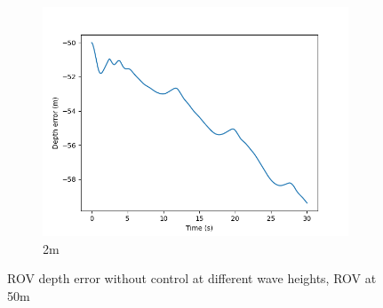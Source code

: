 \documentclass[class=article, crop=false]{standalone}
\begin{document}
\begin{figure}
\begin{subfigure}[b]{0.48\textwidth}
        \includegraphics{scenario1/rov-50m/2.0m/rov_depth_error_uncontrolled}
        \caption{2m}
        \label{}
    \end{subfigure}

    \caption{ROV depth error without control at different wave heights, ROV at 50m}
\end{figure}
\end{document}
